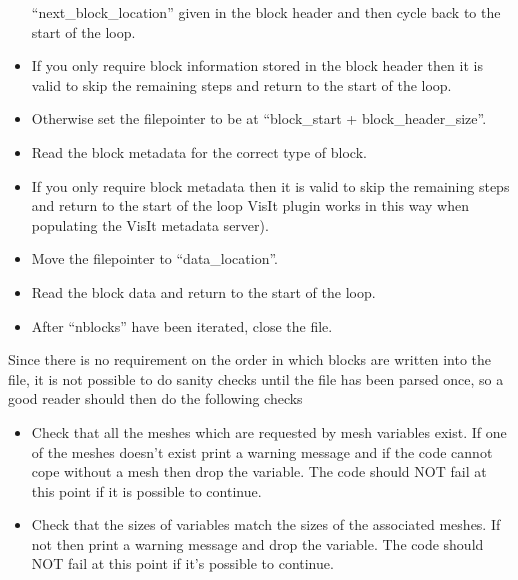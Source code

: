 \documentclass[12pt]{article}
\begin{document}
\begin{itemize}
  ``next\_block\_location'' given in the block header and then cycle back to
  the start of the loop.
\item If you only require block information stored in the block header then
  it is valid to skip the remaining steps and return to the start of the loop.
\item Otherwise set the filepointer to be at ``block\_start +
  block\_header\_size''.
\item Read the block metadata for the correct type of block.
\item If you only require block metadata then it is valid to skip the
  remaining steps and return to the start of the loop VisIt plugin works in
  this way when populating the VisIt metadata server).
\item Move the filepointer to ``data\_location''.
\item Read the block data and return to the start of the loop.
\item After ``nblocks'' have been iterated, close the file.
\end{itemize}

Since there is no requirement on the order in which blocks are written into
the file, it is not possible to do sanity checks until the file has been
parsed once, so a good reader should then do the following checks
\begin{itemize}
\item Check that all the meshes which are requested by mesh variables exist. If
  one of the meshes doesn't exist print a warning message and if the code
  cannot cope without a mesh then drop the variable. The code should NOT fail
  at this point if it is possible to continue.
\item Check that the sizes of variables match the sizes of the associated
  meshes. If not then print a warning message and drop the variable. The code
  should NOT fail at this point if it's possible to continue.
\end{itemize}
\end{document}

